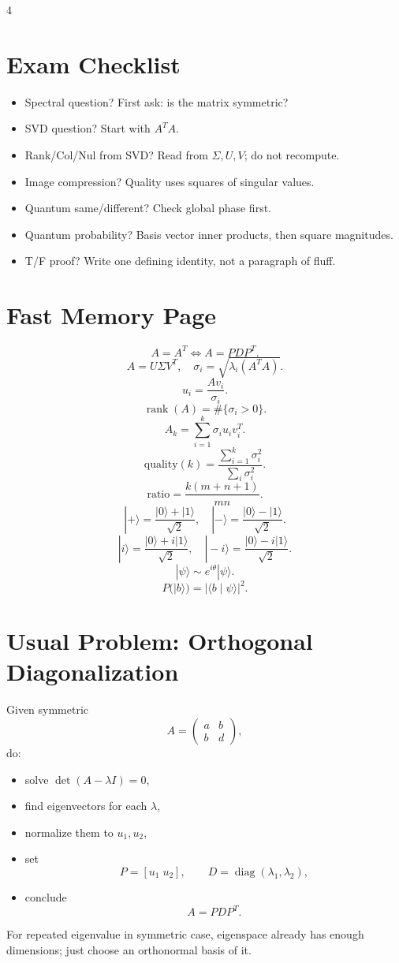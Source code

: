 \documentclass[letterpaper]{article}
\newcommand{\Rank}{\operatorname{rank}}
\newcommand{\diag}{\operatorname{diag}}
\newcommand{\ket}[1]{|#1\rangle}
\newcommand{\braket}[2]{\langle #1 \mid #2\rangle}
\begin{document}
\begin{multicols*}{4}
\section{Exam Checklist}
\begin{itemize}
\item Spectral question? First ask: is the matrix symmetric?
\item SVD question? Start with $A^TA$.
\item Rank/Col/Nul from SVD? Read from $\Sigma,U,V$; do not recompute.
\item Image compression? Quality uses squares of singular values.
\item Quantum same/different? Check global phase first.
\item Quantum probability? Basis vector inner products, then square magnitudes.
\item T/F proof? Write one defining identity, not a paragraph of fluff.
\end{itemize}

\section{Fast Memory Page}
\[
A=A^T \iff A=PDP^T.
\]
\[
A=U\Sigma V^T,\quad \sigma_i=\sqrt{\lambda_i(A^TA)}.
\]
\[
u_i=\frac{Av_i}{\sigma_i}.
\]
\[
\Rank(A)=\#\{\sigma_i>0\}.
\]
\[
A_k=\sum_{i=1}^k \sigma_i u_i v_i^T.
\]
\[
\text{quality}(k)=\frac{\sum_{i=1}^k \sigma_i^2}{\sum_i \sigma_i^2}.
\]
\[
\text{ratio}=\frac{k(m+n+1)}{mn}.
\]
\[
\ket+ = \frac{\ket0+\ket1}{\sqrt2},\quad
\ket- = \frac{\ket0-\ket1}{\sqrt2}.
\]
\[
\ket{i} = \frac{\ket0+i\ket1}{\sqrt2},\quad
\ket{-i} = \frac{\ket0-i\ket1}{\sqrt2}.
\]
\[
\ket{\psi}\sim e^{i\theta}\ket{\psi}.
\]
\[
P(\ket b)=|\braket{b}{\psi}|^2.
\]

\section{Usual Problem: Orthogonal Diagonalization}
Given symmetric
\[
A=\begin{pmatrix}a&b\\b&d\end{pmatrix},
\]
do:
\begin{itemize}
\item solve $\det(A-\lambda I)=0$,
\item find eigenvectors for each $\lambda$,
\item normalize them to $u_1,u_2$,
\item set
\[
P=[u_1\;u_2],\qquad D=\diag(\lambda_1,\lambda_2),
\]
\item conclude
\[
A=PDP^T.
\]
\end{itemize}
For repeated eigenvalue in symmetric case, eigenspace already has enough dimensions; just choose an orthonormal basis of it.


\end{multicols*}
\end{document}
